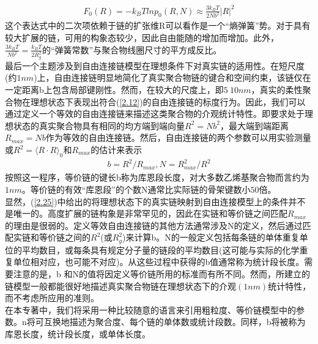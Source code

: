 \begin{gather}
F_0(R)=-k_{B}Tlnp_0(R,N)\approx \frac{3k_{B}T}{2Nb^2}|R|^2
\label{2.24}
\end{gather}
这个表达式中的二次项依赖于链的扩张维R可以看作是一个“熵弹簧”势。对于具有较大扩展的链，可用的构象态较少，因此自由能随的增加而增加。此外，$\frac{3k_{B}T}{Nb^2}=\frac{k_{B}T}{2R^2_{g}}$的“弹簧常数”与聚合物线圈尺寸的平方成反比。\\

最后一个主题涉及到自由连接链模型在理想条件下对真实链的适用性。在短尺度(约$1nm$)上，自由连接链明显地简化了真实聚合物链的键合和空间约束，该链仅在一定距离b上包含局部键刚性。然而，在较大的尺度上，即$5~10nm$，真实的柔性聚合物在理想状态下表现出符合(\ref{2.12})的自由连接链的标度行为。因此，我们可以通过定义一个等效的自由连接链来描述这类聚合物的介观统计特性。即要求处于理想状态的真实聚合物具有相同的均方端到端向量$R^2=Nb^2$，最大端到端距离$R_{max}=Nb$作为等效的自由连接链。然后，自由连接链的两个参数可以用实验测量或$R^2=\langle R \cdot R\rangle_{0}$和$R_{max}$的估计来表示\\
\begin{gather}
b=R^2/R_{max},N=R_{max}^{2}/R^2
\label{2.25}
\end{gather}
按照这一程序，等价链的键长b称为库恩段长度，对大多数乙烯基聚合物而言约为$1nm$。等价链的有效“库恩段”的个数N通常比实际链的骨架键数小$50$倍。\\

显然，(\ref{2.25})中给出的将理想状态下的真实链映射到自由连接模型上的条件并不是唯一的。高度扩展的链构象是非常罕见的，因此在实链和等价链之间匹配$R_{max}$的理由是很弱的。定义等效自由连接链的其他方法通常涉及N的定义，然后通过匹配实链和等价链之间的$R^2$(或$R_{g}^{2}$)来计算b。N的一般定义包括每条链的单体重复单位的平均数目，或每条具有规定分子量的链段的平均数目(这可能与实际的化学重复单位相对应，也可能不对应)。从这些过程中获得的b值通常称为统计段长度。需要注意的是，b 和N的值将因定义等价链所用的标准而有所不同。然而，所建立的链模型一般都能很好地描述真实聚合物链在理想状态下的介观$(1nm)$统计特性，而不考虑所应用的准则。\\

在本专著中，我们将采用一种比较随意的语言来引用粗粒度、等价链模型中的参数。n将可互换地描述为聚合度、每个链的单体数或统计段数。同样，b将被称为库恩长度，统计段长度，或单体长度。\\
\endinput

